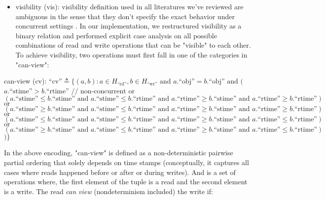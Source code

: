 \begin{itemize}
  \item visibility (vis): visibility definition used in all
    literatures we've reviewed
    are ambiguous in the sense that they don't specify the exact behavior under
    concurrent settings \cite{viotti2016consistency}
    \cite{viotti2016towards} \cite{zhang2018building}
    \cite{ferreira2023antipode}. In our implementation, we
    restructured visibility as a
    binary relation and performed explicit case analysis on all possible
    combinations of read and write operations that can be "visible"
    to each other.
    To achieve visibility, two operations must first fall in one of
    the categories
    in "can-view":
\end{itemize}

can-view (cv): $\text{``cv''} \triangleq \{(a, b) : a \in
  H_\text{``rd''}, b \in H_\text{``wr''} \text{ and }
  a.\text{``obj''} = b.\text{``obj''} \text{ and } ($
    $a.\text{``stime''} > b.\text{``rtime''} \text{ // non-concurrent}$
    $\text{or}$
    $(a.\text{``stime''} \leq b.\text{``stime''} \text{ and }
      a.\text{``stime''} \leq b.\text{``rtime''} \text{ and }
      a.\text{``rtime''} \geq b.\text{``stime''} \text{ and }
    a.\text{``rtime''} \geq b.\text{``rtime''})$
    $\text{or}$
    $(a.\text{``stime''} \geq b.\text{``stime''} \text{ and }
      a.\text{``stime''} \leq b.\text{``rtime''} \text{ and }
      a.\text{``rtime''} \geq b.\text{``stime''} \text{ and }
    a.\text{``rtime''} \geq b.\text{``rtime''})$
    $\text{or}$
    $(a.\text{``stime''} \leq b.\text{``stime''} \text{ and }
      a.\text{``stime''} \leq b.\text{``rtime''} \text{ and }
      a.\text{``rtime''} \geq b.\text{``stime''} \text{ and }
    a.\text{``rtime''} \leq b.\text{``rtime''})$
    $\text{or}$
    $(a.\text{``stime''} \geq b.\text{``stime''} \text{ and }
      a.\text{``stime''} \leq b.\text{``rtime''} \text{ and }
      a.\text{``rtime''} \geq b.\text{``stime''} \text{ and }
    a.\text{``rtime''} \leq b.\text{``rtime''})$
$)\}$

In the above encoding, "can-view" is defined as a non-deterministic pairwise
partial ordering that solely depends on time stamps (conceptually, it captures
all cases where reads happened before or after or during writes). And is a set
of operations where, the first element of the tuple is a read and the second
element is a write. The read \textit{can view} (nondeterminism
included) the write if:

